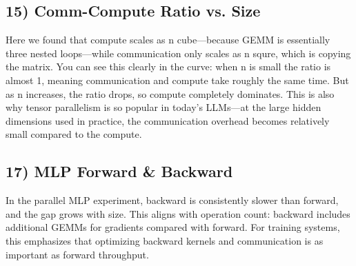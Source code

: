 \documentclass[11pt]{article}
\begin{document}

\subsection*{15) Comm-Compute Ratio vs. Size}
Here we found that compute scales as n cube---because GEMM is essentially three nested loops---while communication only scales as n squre, which is copying the matrix. You can see this clearly in the curve: when n is small the ratio is almost 1, meaning communication and compute take roughly the same time. But as n increases, the ratio drops, so compute completely dominates. This is also why tensor parallelism is so popular in today's LLMs---at the large hidden dimensions used in practice, the communication overhead becomes relatively small compared to the compute.


\subsection*{17) MLP Forward \& Backward}
In the parallel MLP experiment, backward is consistently slower than forward, and the gap grows with size. This aligns with operation count: backward includes additional GEMMs for gradients compared with forward. For training systems, this emphasizes that optimizing backward kernels and communication is as important as forward throughput.
\end{document}
